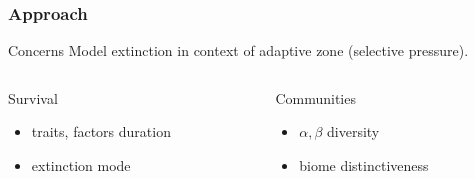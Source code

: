 \documentclass{beamer}
\begin{document}
\begin{frame}
  \frametitle{Approach}

  \begin{block}{Concerns}
    Model extinction in context of adaptive zone (\alert{selective pressure}).
  \end{block}

  \vspace{1cm}

  \begin{columns}
    \begin{column}{0.5\textwidth}
      Survival
      \begin{itemize}
        \item traits, factors duration
        \item extinction mode
      \end{itemize}
    \end{column}
    \begin{column}{0.5\textwidth}
      Communities
      \begin{itemize}
        \item \(\alpha, \beta\) diversity
        \item biome distinctiveness
      \end{itemize}
    \end{column}
  \end{columns}

\end{frame}
\end{document}
